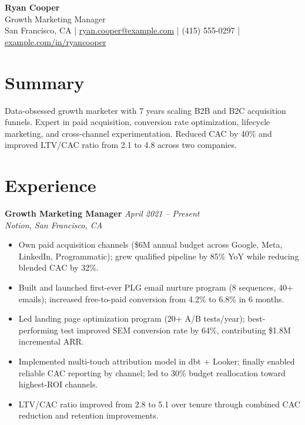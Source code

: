 \documentclass[11pt,a4paper]{article}
\begin{document}
\begin{center}
  {\LARGE \textbf{Ryan Cooper}}\\[3pt]
  {\large \textcolor{accent}{Growth Marketing Manager}}\\[4pt]
  San Francisco, CA \quad|\quad
  \href{mailto:ryan.cooper@example.com}{ryan.cooper@example.com} \quad|\quad
  (415) 555-0297 \quad|\quad
  \href{https://example.com/in/ryancooper}{example.com/in/ryancooper}
\end{center}

\section{Summary}
Data-obsessed growth marketer with 7 years scaling B2B and B2C acquisition funnels. Expert in paid acquisition, conversion rate optimization, lifecycle marketing, and cross-channel experimentation. Reduced CAC by 40\% and improved LTV/CAC ratio from 2.1 to 4.8 across two companies.

\section{Experience}

\noindent\textbf{Growth Marketing Manager} \hfill \textit{April 2021 -- Present}\\
\textit{Notion, San Francisco, CA}
\begin{itemize}
  \item Own paid acquisition channels (\$6M annual budget across Google, Meta, LinkedIn, Programmatic); grew qualified pipeline by 85\% YoY while reducing blended CAC by 32\%.
  \item Built and launched first-ever PLG email nurture program (8 sequences, 40+ emails); increased free-to-paid conversion from 4.2\% to 6.8\% in 6 months.
  \item Led landing page optimization program (20+ A/B tests/year); best-performing test improved SEM conversion rate by 64\%, contributing \$1.8M incremental ARR.
  \item Implemented multi-touch attribution model in dbt + Looker; finally enabled reliable CAC reporting by channel; led to 30\% budget reallocation toward highest-ROI channels.
  \item LTV/CAC ratio improved from 2.8 to 5.1 over tenure through combined CAC reduction and retention improvements.
\end{itemize}
\end{document}
